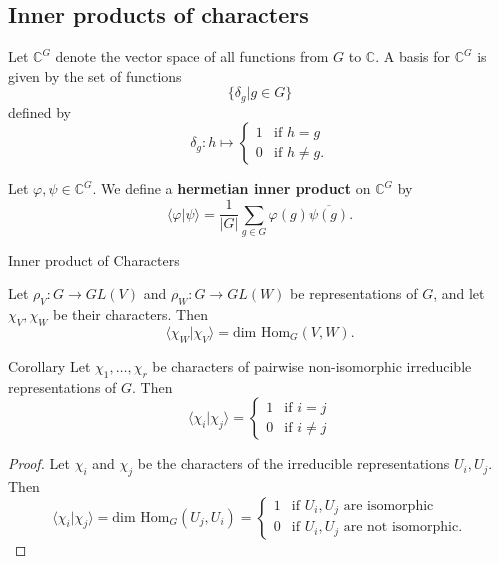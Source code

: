 \subsection{Inner products of characters}
\begin{frame}
\begin{definition}
Let $\mathbb{C}^G$ denote the vector space of all functions from $G$ to $\mathbb{C}$.
A basis for $\mathbb{C}^G$ is given by the set of functions 
\[\{ \delta_g | g \in G  \} \]
defined by 
\[ \delta_g \colon h \mapsto \begin{cases}  1 &\text{if } h = g \\
 0 &\text{if } h \neq g.
\end{cases} \]
\end{definition}
\begin{definition}
Let $\varphi, \psi \in \mathbb{C}^G$.  We define a \textbf{hermetian inner product}  on $\mathbb{C}^G$ by 
\[ \langle \varphi | \psi \rangle = \frac{1}{|G|} \sum_{g \in G} \varphi(g) \overline{\psi(g)}.\]
\end{definition}
\end{frame}

\begin{frame}{Inner product of Characters}
\begin{theorem}
Let $\rho_V \colon G \to GL(V)$ and $\rho_W \colon G \to GL(W)$ be representations of $G$, and let $\chi_V, \chi_W$ be their characters.  Then 
\[ \langle \chi_W | \chi_V \rangle = \text{dim Hom}_G (V,W). \]
\end{theorem}
\end{frame}

\begin{frame}
\begin{block}{Corollary}
Let $\chi_1, \ldots, \chi_r$ be characters of pairwise non-isomorphic irreducible representations of $G$.  Then
\[ \langle \chi_i | \chi_j \rangle = \begin{cases}  1 &\text{if } i = j \\ 0 &\text{if } i \neq j\end{cases} \]
\end{block}
\begin{proof}
Let $\chi_i$ and $\chi_j$ be the characters of the irreducible representations $U_i, U_j$.  Then
\[ \langle \chi_i | \chi_j \rangle = \text{dim Hom}_G (U_j, U_i) = \begin{cases}  1 &\text{if }U_i, U_j \text{ are isomorphic} \\  0 &\text{if }U_i, U_j \text{ are not isomorphic}. \end{cases} \]
\end{proof}
\end{frame}

